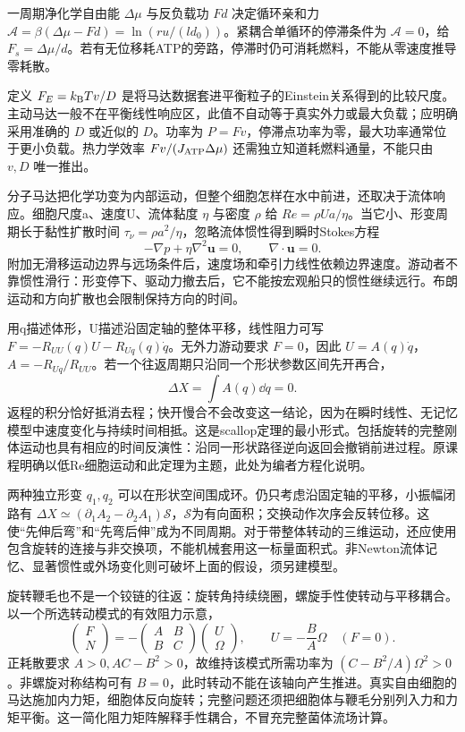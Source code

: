 一周期净化学自由能 $\Delta\mu$ 与反负载功 $Fd$ 决定循环亲和力 $\mathcal A=\beta(\Delta\mu-Fd)=\ln(ru/(ld_0))$。紧耦合单循环的停滞条件为 $\mathcal A=0$，给 $F_s=\Delta\mu/d$。若有无位移耗ATP的旁路，停滞时仍可消耗燃料，不能从零速度推导零耗散。

定义 $F_E=k_{\mathrm B} Tv/D$ 是将马达数据套进平衡粒子的Einstein关系得到的比较尺度。主动马达一般不在平衡线性响应区，此值不自动等于真实外力或最大负载；应明确采用准确的 $D$ 或近似的 $D$。功率为 $P=Fv$，停滞点功率为零，最大功率通常位于更小负载。热力学效率 $Fv/(J_{\rm ATP}\Delta\mu)$ 还需独立知道耗燃料通量，不能只由 $v,D$ 唯一推出。


分子马达把化学功变为内部运动，但整个细胞怎样在水中前进，还取决于流体响应。细胞尺度a、速度U、流体黏度 $\eta$ 与密度 $\rho$ 给 $Re=\rho Ua/\eta$。当它小、形变周期长于黏性扩散时间 $\tau_\nu=\rho a^2/\eta$，忽略流体惯性得到瞬时Stokes方程
\[
 -\nabla p+\eta\nabla^2\mathbf u=0,\qquad \nabla\cdot\mathbf u=0.
\]
附加无滑移运动边界与远场条件后，速度场和牵引力线性依赖边界速度。游动者不靠惯性滑行：形变停下、驱动力撤去后，它不能按宏观船只的惯性继续远行。布朗运动和方向扩散也会限制保持方向的时间。

用q描述体形，U描述沿固定轴的整体平移，线性阻力可写 $F=-R_{UU}(q)U-R_{Uq}(q)\dot q$。无外力游动要求 $F=0$，因此 $U=A(q)\dot q$，$A=-R_{Uq}/R_{UU}$。若一个往返周期只沿同一个形状参数区间先开再合，
\[
 \Delta X=\int A(q)\dd q=0.
\]
返程的积分恰好抵消去程；快开慢合不会改变这一结论，因为在瞬时线性、无记忆模型中速度变化与持续时间相抵。这是scallop定理的最小形式。包括旋转的完整刚体运动也具有相应的时间反演性：沿同一形状路径逆向返回会撤销前进过程。原课程明确以低Re细胞运动和此定理为主题，此处为编者方程化说明。

两种独立形变 $q_1,q_2$ 可以在形状空间围成环。仍只考虑沿固定轴的平移，小振幅闭路有 $\Delta X\simeq(\partial_1A_2-\partial_2A_1)\mathcal S$，$\mathcal S$为有向面积；交换动作次序会反转位移。这使“先伸后弯”和“先弯后伸”成为不同周期。对于带整体转动的三维运动，还应使用包含旋转的连接与非交换项，不能机械套用这一标量面积式。非Newton流体记忆、显著惯性或外场变化则可破坏上面的假设，须另建模型。

旋转鞭毛也不是一个铰链的往返：旋转角持续绕圈，螺旋手性使转动与平移耦合。以一个所选转动模式的有效阻力示意，
\[
 \begin{pmatrix}F\\N\end{pmatrix}
 =-\begin{pmatrix}A&B\\B&C\end{pmatrix}
 \begin{pmatrix}U\\\Omega\end{pmatrix},\qquad
 U=-\frac BA\Omega\quad(F=0).
\]
正耗散要求 $A>0,AC-B^2>0$，故维持该模式所需功率为 $(C-B^2/A)\Omega^2>0$。非螺旋对称结构可有 $B=0$，此时转动不能在该轴向产生推进。真实自由细胞的马达施加内力矩，细胞体反向旋转；完整问题还须把细胞体与鞭毛分别列入力和力矩平衡。这一简化阻力矩阵解释手性耦合，不冒充完整菌体流场计算。

